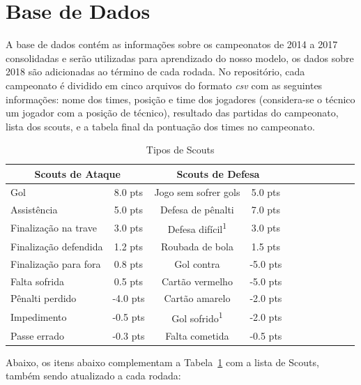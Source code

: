 \documentclass[conference]{IEEEtran}
\newcommand{\rtab}[1]{Tabela~\ref{tab:#1}}
\newcommand{\tit}[1]{{\textit{#1}}}
\newcommand{\ts}{\textsuperscript}
\begin{document}
\section{Base de Dados}

A base de  dados \cite{git_cartola} contém as  informações sobre os
campeonatos  de 2014  a  2017 consolidadas  e  serão utilizadas  para
aprendizado do nosso  modelo, os dados sobre 2018  são adicionadas ao
término de cada rodada. No  repositório, cada campeonato é dividido
em cinco arquivos do formato \tit{csv} com as seguintes informações:
nome  dos  times,  posição  e time  dos  jogadores  (considera-se  o
técnico  um  jogador com  a  posição  de técnico),  resultado  das
partidas  do  campeonato,  lista  dos  scouts, e  a  tabela  final  da
pontuação dos times no campeonato.

\begin{table}[h]
\begin{center}
\caption[]{Tipos de Scouts}
\label{tab:model}
\begin{tabular}{| l | c | c | c | c | c | c | c | c | c | c |}
\hline
\multicolumn{2}{|c|}{Scouts de Ataque} & \multicolumn{2}{|c|}{Scouts de Defesa} \\
\hline
Gol                   &  8.0 pts & Jogo sem sofrer gols &  5.0 pts \\
Assistência           &  5.0 pts & Defesa de pênalti    &  7.0 pts \\
Finalização na trave  &  3.0 pts & Defesa difícil\ts{1} &  3.0 pts \\
Finalização defendida &  1.2 pts & Roubada de bola      &  1.5 pts \\
Finalização para fora &  0.8 pts & Gol contra           & -5.0 pts \\
Falta sofrida         &  0.5 pts & Cartão vermelho      & -5.0 pts \\
Pênalti perdido       & -4.0 pts & Cartão amarelo       & -2.0 pts \\
Impedimento           & -0.5 pts & Gol sofrido\ts{1}    & -2.0 pts \\
Passe errado          & -0.3 pts & Falta cometida       & -0.5 pts \\
\hline
\end{tabular}
\end{center}
\end{table}

Abaixo, os  itens abaixo  complementam a \rtab{model}  com a  lista de
Scouts, também sendo atualizado a cada rodada:
\end{document}
